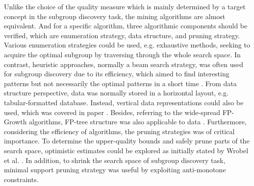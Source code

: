 Unlike the choice of the quality measure which is mainly determined by a target concept in the subgroup discovery task, the mining algorithms are almost equivalent. And for a specific algorithm, three algorithmic components should be verified, which are enumeration strategy, data structure, and pruning strategy. Various enumeration strategies could be used, e.g. exhaustive methods, seeking to acquire the optimal subgroup by traversing through the whole search space. In contrast, heuristic approaches, normally a beam search strategy, was often used for subgroup discovery due to its efficiency, which aimed to find interesting patterns but not necessarily the optimal patterns in a short time \cite{clark1989cn2}. From data structure perspective, data was normally stored in a horizontal layout, e.g. tabular-formatted database. Instead, vertical data representations could also be used, which was covered in paper \cite{zaki2000scalable}. Besides, referring to the wide-spread FP-Growth algorithms, FP-tree structure was also applicable to data \cite{han2000mining}. Furthermore, considering the efficiency of algorithms, the pruning strategies was of critical importance. To determine the upper-quality bounds and safely prune parts of the search space, optimistic estimates could be explored as initially stated by Wrobel et al. \cite{wrobel1997algorithm}. In addition, to shrink the search space of subgroup discovery task, minimal support pruning strategy was useful by exploiting anti-monotone constraints.



